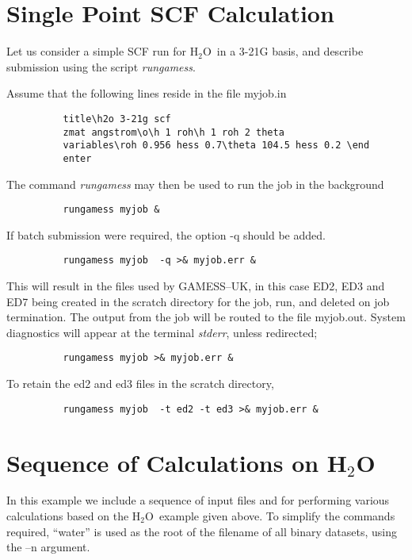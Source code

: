 \documentclass[11pt,fleqn]{article}
\newcommand{\water}{\mbox{H$_{2}$O}}
\begin{document}
\section[Single Point SCF Calculation]{Single Point SCF Calculation}

Let us consider a simple SCF run for \water\ in a 3-21G basis,
and describe submission using the script {\em rungamess}.

Assume that the following lines reside in the file myjob.in
{
\footnotesize
\begin{verbatim}
          title\h2o 3-21g scf
          zmat angstrom\o\h 1 roh\h 1 roh 2 theta
          variables\roh 0.956 hess 0.7\theta 104.5 hess 0.2 \end
          enter 
\end{verbatim}
}
The command {\em rungamess} may then be used to run the job in the background
{
\footnotesize
\begin{verbatim}
          rungamess myjob &
\end{verbatim}
}
If batch submission were required, the option -q should be added.
{
\footnotesize
\begin{verbatim}
          rungamess myjob  -q >& myjob.err &
\end{verbatim}
}

This will result in the files used by GAMESS--UK, in this case ED2, ED3 and
ED7 being created in the scratch directory for the job,
run, and deleted on job termination. The output from the job will
be routed to the file myjob.out. System diagnostics will appear
at the terminal {\em stderr}, unless redirected;

{
\footnotesize
\begin{verbatim}
          rungamess myjob >& myjob.err &
\end{verbatim}
}

To retain the ed2 and ed3 files in the scratch directory,

{
\footnotesize
\begin{verbatim}
          rungamess myjob  -t ed2 -t ed3 >& myjob.err &
\end{verbatim}
}


\section[Sequence of Calculations on \water]{Sequence of Calculations on \water}

In this example we include a sequence of input files and for
performing various calculations based on the \water\ example given
above. To simplify the commands required, ``water'' is used as the
root of the filename of all binary datasets, using the --n argument.
\end{document}

